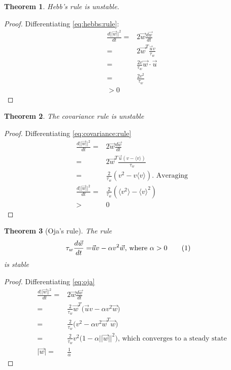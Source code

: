 \documentclass[]{article}
\newcommand\numberthis{\addtocounter{equation}{1}\tag{\theequation}}
\newtheorem{thm}{Theorem}
\begin{document}
\begin{thm}
	Hebb's rule is unstable.
\end{thm}

\begin{proof}
	Differentiating \eqref{eq:hebbs:rule}:
	\begin{align*}
		\frac{d\lvert\lvert\vec{w}\rvert\rvert^2}{dt} =& 2 \vec{w} \frac{d\vec{w}}{dt}\\
		=& 2\vec{w}^T\frac{\vec{u} v}{\tau_w}\\
		=& \frac{2v}{\tau_w} \vec{w} \cdot \vec{u}\\
		=& \frac{2v^2}{\tau_w}\\
		>0
	\end{align*}
\end{proof}

\begin{thm}
	The covariance rule is unstable
\end{thm}

\begin{proof}
	Differentiating \eqref{eq:covariance:rule}
	\begin{align*}
		\frac{d\lvert\lvert\vec{w}\rvert\rvert^2}{dt} =& 2 \vec{w} \frac{d\vec{w}}{dt}\\
		=& 2 \vec{w}^T \frac{\vec{u}(v-\langle v \rangle)}{\tau_w}\\
		=& \frac{2}{\tau_w} (v^2-v\langle v \rangle)\text{. Averaging}\\
		\frac{d\lvert\lvert\vec{w}\rvert\rvert^2}{dt} =& \frac{2}{\tau_w}(\langle v^2 \rangle - \langle v \rangle^2)\\
		>& 0
	\end{align*}
\end{proof}

\begin{thm}[Oja's rule]
	The rule
	\begin{align*}
		\tau_w \frac{d\vec{w}}{dt} =& \vec{u} v - \alpha v^2 \vec{w} \text{, where $\alpha>0$} \numberthis \label{eq:oja}
	\end{align*}
is stable
\end{thm}

\begin{proof}
	Differentiating \eqref{eq:oja}
	\begin{align*}
		\frac{d\lvert\lvert\vec{w}\rvert\rvert^2}{dt} =& 2 \vec{w} \frac{d\vec{w}}{dt}\\
		=& \frac{2}{\tau_w} \vec{w}^T\big(\vec{u}v - \alpha v^2 \vec{w}\big)\\
		=& \frac{2}{\tau_w} \big( v^2 - \alpha v^2 \vec{w}^T\vec{w}\big)\\
		=& \frac{2}{\tau_w} v^2 \big(1 - \alpha\lvert\lvert\vec{w}\rvert\rvert^2\big)\text{, which converges to a steady state}\\
		\lvert\vec{w}\rvert =& \frac{1}{\alpha}
	\end{align*}
\end{proof}
\end{document}
